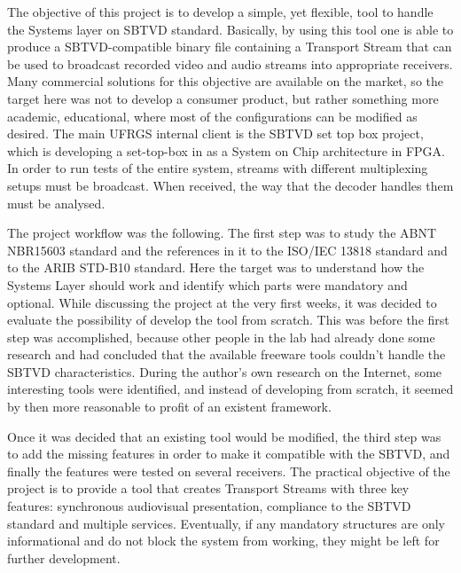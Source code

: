\documentclass[
	12pt,				%
	openright,			%
	twoside,			%
	a4paper,			%
	brazil,
	french,				%
	english
	]{abntex2}
\begin{document}
The objective of this project is to develop a simple, yet flexible, tool to handle the Systems layer on SBTVD standard. Basically, by using this tool one is able to produce a SBTVD-compatible binary file containing a Transport Stream that can be used to broadcast recorded video and audio streams into appropriate receivers. Many commercial solutions for this objective are available on the market, so the target here was not to develop a consumer product, but rather something more academic, educational, where most of the configurations can be modified as desired. The main UFRGS internal client is the SBTVD set top box project, which is developing a set-top-box in as a System on Chip architecture in FPGA. In order to run tests of the entire system, streams with different multiplexing setups must be broadcast. When received, the way that the decoder handles them must be analysed.

The project workflow was the following. The first step was to study the ABNT NBR15603 standard and the references in it to the ISO/IEC 13818 standard and to the ARIB STD-B10 standard. Here the target was to understand how the Systems Layer should work and identify which parts were mandatory and optional. While discussing the project at the very first weeks, it was decided to evaluate the possibility of develop the tool from scratch. This was before the first step was accomplished, because other people in the lab had already done some research and had concluded that the available freeware tools couldn't handle the SBTVD characteristics. During the author's own research on the Internet, some interesting tools were identified, and instead of developing from scratch, it seemed by then more reasonable to profit of an existent framework.

Once it was decided that an existing tool would be modified, the third step was to add the missing features in order to make it compatible with the SBTVD, and finally the features were tested on several receivers. The practical objective of the project is to provide a tool that creates Transport Streams with three key features: synchronous audiovisual presentation, compliance to the SBTVD standard and multiple services. Eventually, if any mandatory structures are only informational and do not block the system from working, they might be left for further development.

\end{document}
